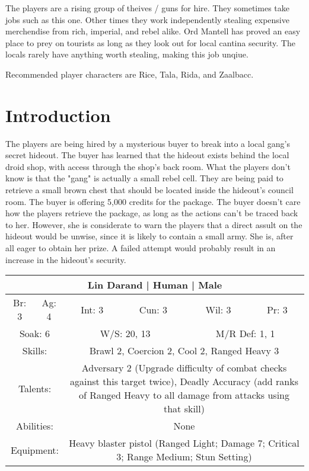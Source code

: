 \documentclass[letterpaper]{article}
\begin{document}
The players are a rising group of theives / guns for hire. They sometimes take jobs such as this one. Other times they work independently stealing expensive merchendise from rich, imperial, and rebel alike. Ord Mantell has proved an easy place to prey on tourists as long as they look out for local cantina security. The locals rarely have anything worth stealing, making this job unqiue.

Recommended player characters are Rice, Tala, Rida, and Zaalbacc.

\section{Introduction}

The players are being hired by a mysterious buyer to break into a local gang's secret hideout. The buyer has learned that the hideout exists behind the local droid shop, with access through the shop's back room. What the players don't know is that the "gang" is actually a small rebel cell. They are being paid to retrieve a small brown chest that should be located inside the hideout's council room. The buyer is offering 5,000 credits for the package. The buyer doesn't care how the players retrieve the package, as long as the actions can't be traced back to her. However, she is considerate to warn the players that a direct assult on the hideout would be unwise, since it is likely to contain a small army. She is, after all eager to obtain her prize. A failed attempt would probably result in an increase in the hideout's security.

\begin{center}
\begin{tabular}{| c c c c c c |}
    \hline
    \multicolumn{6}{|c|}{Lin Darand | Human | Male} \\
    \hline
    Br: 3 & Ag: 4 & Int: 3 & Cun: 3 & Wil: 3 & Pr: 3 \\[2mm]
    \multicolumn{2}{|c}{Soak: 6} & \multicolumn{2}{c}{W/S: 20, 13} & \multicolumn{2}{c|}{M/R Def: 1, 1} \\
    \hline
    \multicolumn{2}{|c}{Skills:} & \multicolumn{4}{p{5cm}|}{Brawl 2, Coercion 2, Cool 2, Ranged Heavy 3} \\
    \multicolumn{2}{|c}{Talents:} & \multicolumn{4}{p{5cm}|}{Adversary 2 (Upgrade difficulty of combat checks against this target twice), Deadly Accuracy (add ranks of Ranged Heavy to all damage from attacks using that skill)} \\
    \multicolumn{2}{|c}{Abilities:} & \multicolumn{4}{p{5cm}|}{None} \\
    \multicolumn{2}{|c}{Equipment:} & \multicolumn{4}{p{5cm}|}{Heavy blaster pistol (Ranged Light; Damage 7; Critical 3; Range Medium; Stun Setting)} \\
    \hline
\end{tabular}
\end{center}
\end{document}
